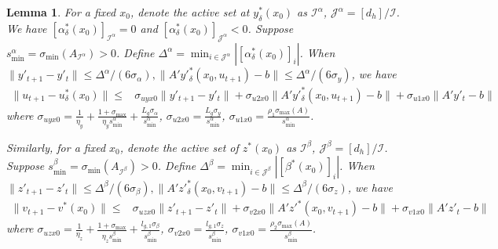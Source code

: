 \documentclass{article}
\newcommand{\Ic}{\mathcal{I}}
\newcommand{\Jc}{\mathcal{J}}
\theoremstyle{plain}
\newtheorem{lemma}[theorem]{Lemma}
\theoremstyle{definition}
\theoremstyle{remark}
\begin{document}
\begin{lemma}\label{lemma: uv eb licq}
    For a fixed $x_0$, denote the active set at $y^*_\delta(x_0)$ as $\Ic^\alpha$, $\Jc^\alpha=[d_h]/\Ic$. We have $[\alpha^*_\delta(x_0)]_{\Ic^\alpha}=0$ and $[\alpha^*_\delta(x_0)]_{\Jc^\alpha}< 0$. Suppose $s^\alpha_{\min}=\sigma_{\min}(A_{\Ic^\alpha})>0$.  Define $\Delta^\alpha=\min_{i\in\Jc^\alpha}|[\alpha^*_\delta(x_0)]_i|$. When $\|y'_{t+1}-y'_t\|\leq \Delta^\alpha/(6\sigma_{\alpha}), \|A'y'^*_\delta(x_0,u_{t+1})-b\|\leq \Delta^\alpha/(6\sigma_y) $, we have
\begin{align*}
    \|u_{t+1}-u^*_\delta(x_0)\|\leq& \sigma_{uyx0}\|y'_{t+1}-y'_t\|+\sigma_{u2x0}\|A'y'^*_\delta(x_0,u_{t+1})-b\|+ \sigma_{u1x0}\|A'y'_t-b\|
\end{align*}
where $\sigma_{uyx0}=\frac{1}{\eta_y}+\frac{1+\sigma_{\max}}{\eta_ys_{\min}^\alpha}+\frac{L_g\sigma_\alpha}{s_{\min}^\alpha}$, $\sigma_{u2x0}=\frac{L_g\sigma_y}{s_{\min}^\alpha}$, $\sigma_{u1x0}=\frac{\rho_1 \sigma_{\max}(A)}{s_{\min}^\alpha}$.

Similarly, for a fixed $x_0$, denote the active set of $z^*(x_0)$ as $\Ic^\beta$, $\Jc^\beta=[d_h]/\Ic$. Suppose $s^\beta_{\min}=\sigma_{\min}(A_{\Ic^\beta})>0$. Define $\Delta^\beta=\min_{i\in\Jc^\beta}|[\beta^*(x_0)]_i|$. When $\|z'_{t+1}-z'_t\|\leq \Delta^\beta/(6\sigma_{\beta}), \|A'z'^*_\delta(x_0,v_{t+1})-b\|\leq \Delta^\beta/(6\sigma_z) $, we have
\begin{align*}
    \|v_{t+1}-v^*(x_0)\|\leq& \sigma_{uzx0}\|z'_{t+1}-z'_t\|+\sigma_{v2x0}\|A'z'^*(x_0,v_{t+1})-b\|+ \sigma_{v1x0}\|A'z'_t-b\|
\end{align*}
where $\sigma_{uzx0}=\frac{1}{\eta_z}+\frac{1+\sigma_{\max}}{\eta_zs_{\min}^\beta}+\frac{l_{g,1}\sigma_\beta}{s_{\min}^\beta}$, $\sigma_{v2x0}=\frac{l_{g,1}\sigma_z}{s_{\min}^\beta}$, $\sigma_{v1x0}=\frac{\rho_2 \sigma_{\max}(A)}{s_{\min}^\beta}$.

\end{lemma}
\end{document}
